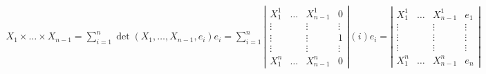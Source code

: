 \begin{align*}
 X_1 \times \dots \times X_{n-1} = \sum_{i=1}^n \det (X_1, \dots, X_{n-1},e_i)e_i = \sum_{i=1}^n \left\vert\begin{matrix}
                                                                                                  X_1^1  &\dots  &X_{n-1}^1 &0 \\
                                                                                                  \vdots &       & \vdots   &\vdots \\
                                                                                                  \vdots &       & \vdots   &1 \\
                                                                                                  \vdots &       & \vdots   & \vdots \\
                                                                                                  X_1^n  & \dots &X_{n-1}^n &0
                                                                                                 \end{matrix}
                                                                                                 \right\vert (i) e_i = \left\vert\begin{matrix}
                                                                                                                    X_1^1 & \dots & X_{n-1}^1 & e_1 \\
                                                                                                                    \vdots & & \vdots & \vdots \\
                                                                                                                    \vdots & & \vdots & \vdots \\
                                                                                                                    \vdots & & \vdots & \vdots \\
                                                                                                                    X_1^n & \dots & X_{n-1}^n & e_n
                                                                                                                   \end{matrix}
                                                                                                                   \right\vert
\end{align*}
